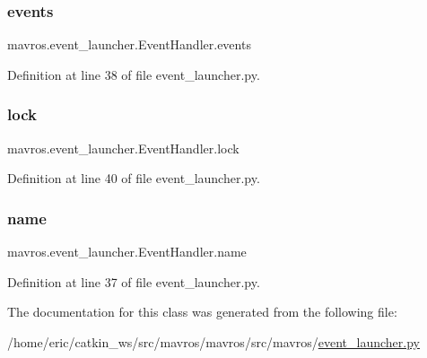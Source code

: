 \subsubsection{\texorpdfstring{events}{events}}
{\footnotesize\ttfamily mavros.\+event\+\_\+launcher.\+Event\+Handler.\+events}



Definition at line 38 of file event\+\_\+launcher.\+py.

\mbox{\label{classmavros_1_1event__launcher_1_1EventHandler_a435597d6bfff6d9fb8c30b2f19e3bab9}} 
\subsubsection{\texorpdfstring{lock}{lock}}
{\footnotesize\ttfamily mavros.\+event\+\_\+launcher.\+Event\+Handler.\+lock}



Definition at line 40 of file event\+\_\+launcher.\+py.

\mbox{\label{classmavros_1_1event__launcher_1_1EventHandler_a09c331d1fc6308e8439779f0e15b83c2}} 
\subsubsection{\texorpdfstring{name}{name}}
{\footnotesize\ttfamily mavros.\+event\+\_\+launcher.\+Event\+Handler.\+name}



Definition at line 37 of file event\+\_\+launcher.\+py.



The documentation for this class was generated from the following file\+:\begin{DoxyCompactItemize}
\item 
/home/eric/catkin\+\_\+ws/src/mavros/mavros/src/mavros/\mbox{\hyperlink{event__launcher_8py}{event\+\_\+launcher.\+py}}\end{DoxyCompactItemize}
